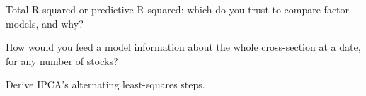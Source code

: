 \begin{interviewq}\label{iq:ml:cross-sectional-deep-models:4}
Total R-squared or predictive R-squared: which do you trust to compare factor models, and why?
\end{interviewq}

\begin{interviewq}\label{iq:ml:cross-sectional-deep-models:5}
How would you feed a model information about the whole cross-section at a date, for any number of stocks?
\end{interviewq}

\begin{interviewq}\label{iq:ml:cross-sectional-deep-models:6}
Derive IPCA's alternating least-squares steps.
\end{interviewq}
